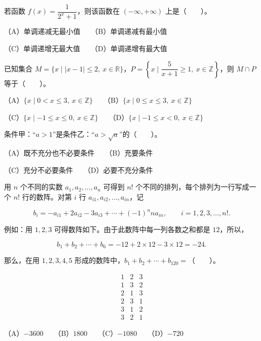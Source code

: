 \begin{question}
若函数 $f(x)=\dfrac{1}{2^x+1}$，则该函数在 $(-\infty,+\infty)$ 上是\mbox{（　　）}。

（A）单调递减无最小值　　（B）单调递减有最小值

（C）单调递增无最大值　　（D）单调递增有最大值

\end{question}
\begin{question}
已知集合 $M=\{x\mid |x-1|\le 2,\ x\in\mathbb R\}$，$P=\left\{x\mid \dfrac{5}{x+1}\ge 1,\ x\in\mathbb Z\right\}$，则 $M\cap P$ 等于\mbox{（　　）}。

（A）$\{x\mid 0<x\le 3,\ x\in\mathbb Z\}$　　（B）$\{x\mid 0\le x\le 3,\ x\in\mathbb Z\}$

（C）$\{x\mid -1\le x\le 0,\ x\in\mathbb Z\}$　　（D）$\{x\mid -1\le x<0,\ x\in\mathbb Z\}$

\end{question}
\begin{question}
条件甲：“$a>1$”是条件乙：“$a>\sqrt a$”的\mbox{（　　）}。

（A）既不充分也不必要条件　　（B）充要条件

（C）充分不必要条件　　（D）必要不充分条件

\end{question}
\begin{question}
用 $n$ 个不同的实数 $a_1,a_2,\ldots,a_n$ 可得到 $n!$ 个不同的排列，每个排列为一行写成一个 $n!$ 行的数阵。对第 $i$ 行 $a_{i1},a_{i2},\ldots,a_{in}$，记

\nopagebreak[4]
\[b_i=-a_{i1}+2a_{i2}-3a_{i3}+\cdots+(-1)^n n a_{in},\qquad i=1,2,3,\ldots,n!.\]

例如：用 $1,2,3$ 可得数阵如下。由于此数阵中每一列各数之和都是 $12$，所以，

\nopagebreak[4]
\[b_1+b_2+\cdots+b_6=-12+2\times12-3\times12=-24.\]

那么，在用 $1,2,3,4,5$ 形成的数阵中，$b_1+b_2+\cdots+b_{120}=$\mbox{（　　）}。

\nopagebreak[4]
\[\begin{array}{ccc}
1&2&3\\
1&3&2\\
2&1&3\\
2&3&1\\
3&1&2\\
3&2&1
\end{array}\]

（A）$-3600$　　（B）$1800$　　（C）$-1080$　　（D）$-720$

\end{question}

